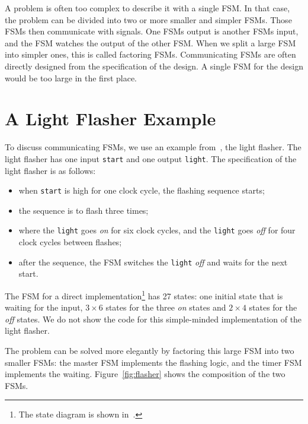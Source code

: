 \documentclass[%
    10pt,
    headinclude, footexclude,
    openright, %
    notitlepage,
    cleardoubleempty,
    headsepline,
    pointlessnumbers,
    bibtotoc, idxtotoc,
    ]{scrbook}
\newcommand{\code}[1]{{\small{\texttt{#1}}}}
\begin{document}
A problem is often too complex to describe it with a single FSM.
In that case, the problem can be divided into two or more smaller and simpler FSMs.
Those FSMs then communicate with signals. One FSMs output is
another FSMs input, and the FSM watches the output of the other FSM.
When we split a large FSM into simpler ones, this is called factoring FSMs.
Communicating FSMs are often directly designed from the specification
of the design. A single FSM for the design would be too large in the first place.

\section{A Light Flasher Example}

To discuss communicating FSMs, we use an example
from~\cite[Chapter~17]{dally:vhdl:2016}, the light flasher.
The light flasher has one input \code{start} and one output
\code{light}. The specification of the light flasher is as follows:
\begin{itemize}
\item when \code{start} is high for one clock cycle, the flashing
sequence starts;
\item the sequence is to flash three times;
\item where the \code{light} goes \emph{on} for six clock cycles, and the \code{light} goes \emph{off} for four clock cycles between flashes;
\item after the sequence, the FSM switches the \code{light} \emph{off} and waits
for the next start.
\end{itemize}

The FSM for a direct implementation\footnote{The state diagram is shown
in~\cite[p.~376]{dally:vhdl:2016}.} has 27 states:
one initial state that is waiting for the input, $3 \times 6$ states for the three
\emph{on} states and $2 \times 4$ states for the \emph{off} states.
We do not show the code for this simple-minded implementation of the light
flasher.

The problem can be solved more elegantly by factoring this large FSM into
two smaller FSMs: the master FSM implements the flashing logic, and the timer FSM
implements the waiting. Figure~\ref{fig:flasher} shows the composition of
the two FSMs.
\end{document}
